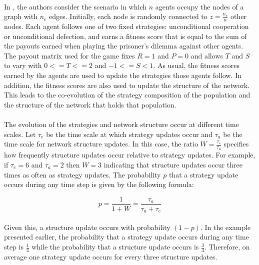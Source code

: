 \documentclass{article}
\begin{document}
	\paragraph{}In \cite{Santos2006d}, the authors consider the scenario in which $n$ agents occupy the nodes of a graph with $n_e$ edges.  Initially, each node is randomly connected to $z=\frac{n_e}{n}$ other nodes.  Each agent follows one of two fixed strategies: unconditional cooperation or unconditional defection, and earns a fitness score that is equal to the sum of the payouts earned when playing the prisoner's dilemma against other agents.  The payout matrix used for the game fixes $R=1$ and $P=0$ and allows $T$ and $S$ to vary with $0<=T<=2$ and $-1<=S<1$.  As usual, the fitness scores earned by the agents are used to update the strategies those agents follow.  In addition, the fitness scores are also used to update the structure of the network.  This leads to the co-evolution of the strategy composition of the population and the structure of the network that holds that population.
	\paragraph{}The evolution of the strategies and network structure occur at different time scales.  Let $\tau_e$ be the time scale at which strategy updates occur and $\tau_a$ be the time scale for network structure updates.  In this case, the ratio $W=\frac{\tau_e}{\tau_a}$ specifies how frequently structure updates occur relative to strategy updates.  For example, if $\tau_e=6$ and $\tau_a=2$ then $W=3$ indicating that structure updates occur three times as often as strategy updates.  The probability $p$ that a strategy update occurs during any time step is given by the following formula:
	
	\begin{equation}
	p=\frac{1}{1+W}=\frac{\tau_a}{\tau_a+\tau_e}
	\end{equation}

	\paragraph{}Given this, a structure update occurs with probability $(1-p)$.  In the example presented earlier, the probability that a strategy update occurs during any time step is $\frac{1}{4}$ while the probability that a structure update occurs is $\frac{3}{4}$.  Therefore, on average one strategy update occurs for every three structure updates.
	\newpage
\end{document}
